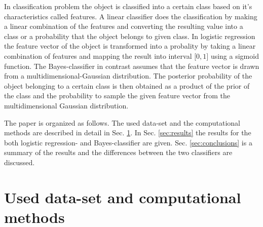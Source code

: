 \documentclass[aps,prb,10pt,twocolumn,groupedaddress]{revtex4-1}
\begin{document}
In classification problem the object is classified into a certain class based
on it's characteristics called features. A linear classifier does the
classification by making a linear combination of the features and converting
the resulting value into a class or a probability that the object belongs to
given class. In logistic regression the feature vector of the object is
transformed into a probality by taking a linear combination of features and
mapping the result into interval $\lbrack 0, 1\rbrack$ using a sigmoid function.
The Bayes-classifier in contrast assumes that the feature vector is drawn from a
multidimensional-Gaussian distribution. The posterior probability of the object
belonging to a certain class is then obtained as a product of the prior of the
class and the probability to sample the given feature vector from the
multidimensional Gaussian distribution.

The paper is organized as follows. The used data-set and the computational
methods are described in detail in Sec. \ref{sec:methods}. In Sec.
\ref{sec:results} the results for the both logistic regression- and
Bayes-classifier are given. Sec. \ref{sec:conclusions} is a
summary of the results and the differences between the two classifiers are
discussed.

\section{Used data-set and computational methods}
\label{sec:methods}
\end{document}
